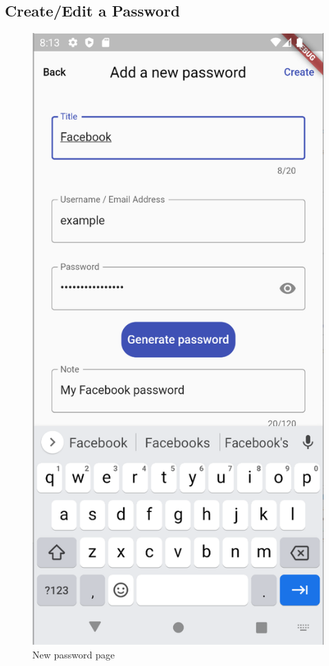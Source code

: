 \documentclass[a4paper,12pt]{report}
\begin{document}
\subsection{Create/Edit a Password}

\begin{figure}[H]
    \centering
    \includegraphics[scale=0.45]{images/app/new_password.png}
    \caption{New password page}\label{fig:new_password}
\end{figure}
\end{document}
